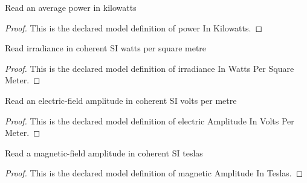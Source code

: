 \begin{definition}
  \label{def:physics:phyx-mini-0944:phyxminiproblems-problemphyxmini0944-powerinkilowatts}
  Read an average power in kilowatts
\end{definition}
\begin{proof}
  This is the declared model definition of power In Kilowatts.
\end{proof}
\begin{definition}
  \label{def:physics:phyx-mini-0944:phyxminiproblems-problemphyxmini0944-irradianceinwattspersquaremeter}
  Read irradiance in coherent SI watts per square metre
\end{definition}
\begin{proof}
  This is the declared model definition of irradiance In Watts Per Square Meter.
\end{proof}
\begin{definition}
  \label{def:physics:phyx-mini-0944:phyxminiproblems-problemphyxmini0944-electricamplitudeinvoltspermeter}
  Read an electric-field amplitude in coherent SI volts per metre
\end{definition}
\begin{proof}
  This is the declared model definition of electric Amplitude In Volts Per Meter.
\end{proof}
\begin{definition}
  \label{def:physics:phyx-mini-0944:phyxminiproblems-problemphyxmini0944-magneticamplitudeinteslas}
  Read a magnetic-field amplitude in coherent SI teslas
\end{definition}
\begin{proof}
  This is the declared model definition of magnetic Amplitude In Teslas.
\end{proof}
